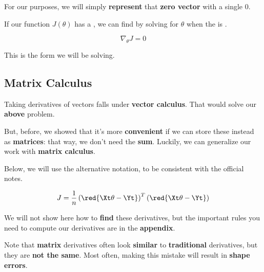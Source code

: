         For our purposes, we will simply \textbf{represent} that \textbf{zero vector} with a single 0.\\
        
        \begin{concept}
            
            If our function $J(\theta)$ has a , we can  find  by solving for $\theta$ when the  is .
            
            \begin{equation*}
                \nabla_\theta J=0
            \end{equation*}

        \end{concept}
        
        
        This is the form we will be solving. 
        
    \subsection{Matrix Calculus}
    
        Taking derivatives of vectors falls under \textbf{vector calculus}. That would solve our \textbf{above} problem.
        
        But, before, we showed that it's more \textbf{convenient} if we can store these instead as \textbf{matrices}: that way, we don't need the \textbf{sum}. Luckily, we can generalize our work with \textbf{matrix calculus}. 
        
        Below, we will use the alternative notation, to be consistent with the official notes.
        
        \begin{equation}
            J = \frac{1}{n}
                \left( \red{ \Xt \theta  - \Yt } \right)^T
                \left( \red{ \Xt \theta  - \Yt } \right) 
        \end{equation}
        
        We will not show here how to \textbf{find} these derivatives, but the important rules you need to compute our derivatives are in the \textbf{appendix}.
        
        Note that \textbf{matrix} derivatives often look \textbf{similar} to \textbf{traditional} derivatives, but they are \textbf{not the same}. Most often, making this mistake will result in \textbf{shape errors}.
        
